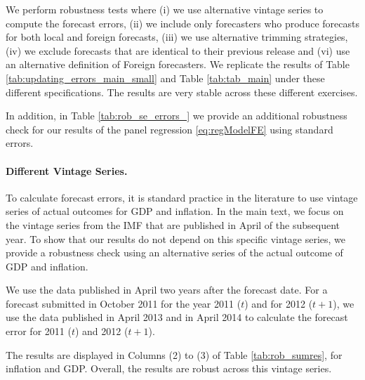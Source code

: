 
We perform robustness tests where (i) we use alternative vintage series to compute the forecast errors, (ii) we include only forecasters who produce forecasts for both local and foreign forecasts, (iii) we use alternative trimming strategies, (iv) we exclude forecasts that are identical to their previous release and (vi) use an alternative definition of Foreign forecasters. We replicate the results of Table \ref{tab:updating_errors_main_small} and Table \ref{tab:tab_main} under these different specifications. The results are very stable across these different exercises. 

In addition, in Table \ref{tab:rob_se_errors_} we provide an additional robustness check for our results of the panel regression \ref{eq:regModelFE} using \citet{Driscoll1998} standard errors.



\paragraph{Different Vintage Series.}
To calculate forecast errors, it is standard practice in the literature to use vintage series of actual outcomes for GDP and inflation. In the main text, we focus on the vintage series from the IMF that are published in April of the subsequent year. To show that our results do not depend on this specific vintage series, we provide a robustness check using an alternative series of the actual outcome of GDP and inflation. 
 
We use the data published in April two years after the forecast date. For a forecast submitted in October 2011 for the year 2011 ($t$) and for 2012 ($t+1$), we use the data published in April 2013 and in April 2014 to calculate the forecast error for 2011 ($t$) and 2012 ($t+1$). 
 
 
 
 
The results are displayed in Columns (2) to (3) of Table \ref{tab:rob_sumres}, for inflation and GDP. Overall, the results are robust across this vintage series.


